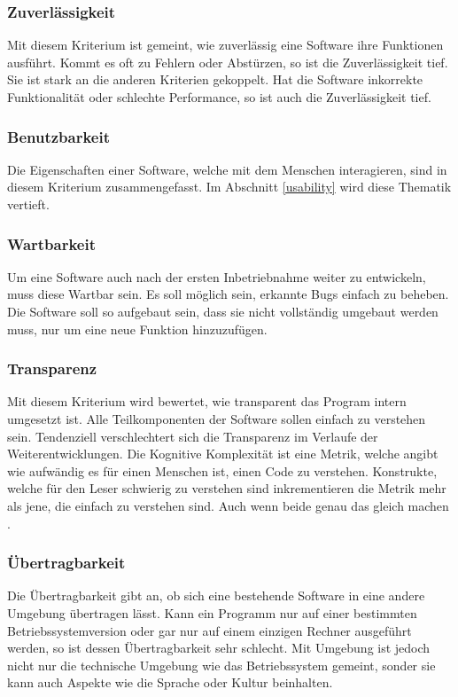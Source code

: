 \subsubsection{Zuverlässigkeit}
Mit diesem Kriterium ist gemeint, wie zuverlässig eine Software ihre Funktionen ausführt.
Kommt es oft zu Fehlern oder Abstürzen, so ist die Zuverlässigkeit tief.
Sie ist stark an die anderen Kriterien gekoppelt.
Hat die Software inkorrekte Funktionalität oder schlechte Performance, so ist auch die Zuverlässigkeit tief.

\subsubsection{Benutzbarkeit}
Die Eigenschaften einer Software, welche mit dem Menschen interagieren, sind in diesem Kriterium zusammengefasst.
Im Abschnitt \ref{usability} wird diese Thematik vertieft.

\subsubsection{Wartbarkeit}
Um eine Software auch nach der ersten Inbetriebnahme weiter zu entwickeln, muss diese Wartbar sein.
Es soll möglich sein, erkannte Bugs einfach zu beheben.
Die Software soll so aufgebaut sein, dass sie nicht vollständig umgebaut werden muss, nur um eine neue Funktion hinzuzufügen.


\subsubsection{Transparenz}\label{transparency}
Mit diesem Kriterium wird bewertet, wie transparent das Program intern umgesetzt ist.
Alle Teilkomponenten der Software sollen einfach zu verstehen sein.
Tendenziell verschlechtert sich die Transparenz im Verlaufe der Weiterentwicklungen.
Die Kognitive Komplexität ist eine Metrik, welche angibt wie aufwändig es für einen Menschen ist, einen Code zu verstehen.
Konstrukte, welche für den Leser schwierig zu verstehen sind inkrementieren die Metrik mehr als jene, die einfach zu verstehen sind.
Auch wenn beide genau das gleich machen \parencite{cognitiveComplexity}.


\subsubsection{Übertragbarkeit}
Die Übertragbarkeit gibt an, ob sich eine bestehende Software in eine andere Umgebung übertragen lässt.
Kann ein Programm nur auf einer bestimmten Betriebssystemversion oder gar nur auf einem einzigen Rechner ausgeführt werden, so ist dessen Übertragbarkeit sehr schlecht.
Mit Umgebung ist jedoch nicht nur die technische Umgebung wie das Betriebssystem gemeint, sonder sie kann auch Aspekte wie die Sprache oder Kultur beinhalten.

